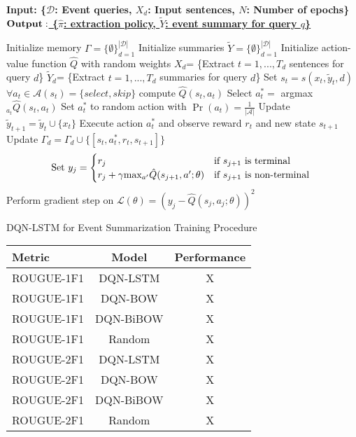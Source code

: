 \documentclass[12pt]{article}
\begin{document}
\begin{algorithm}
    \bf{Input:} { \rm  \{$\mathcal{D}$: Event queries, $X_d$: Input sentences, $N$: Number of epochs\} } \\
    \underline{$\bf{Output: }$ \rm \{$\hat{\pi}$: extraction policy, $\tilde{Y}$: event summary for query $q$\} }
\begin{algorithmic}[1]
\STATE \rm Initialize memory $\Gamma =  \{\emptyset \}^{\mathcal{|D|}}_{d=1}$
\STATE \rm Initialize summaries $\tilde{Y} = \{\emptyset \}^{\mathcal{|D|}}_{d=1} $
\STATE \rm Initialize action-value function $\hat{Q}$ with random weights
		\STATE $X_{d}$= \{Extract $t=1,...,T_d$ sentences for query $d$\}
		\STATE $\tilde{Y}_{d}$= \{Extract $t=1,...,T_d$ summaries for query $d$\}
			\STATE Set $s_t = s(x_t, \tilde{y}_t, d)$
			\STATE $ \forall a_t \in \mathcal{A}(s_t) = \{select, skip\}$ \textrm{compute} $\hat{Q}(s_t, a_t)$
			\STATE Select $a^{*}_t =$ argmax$_{a_{t}}\hat{Q}(s_t, a_t)$
				\STATE  Set $a^{*}_t $ to random action with $\Pr(a_t) =\frac{1}{| \mathcal{A} |} $
			\ENDIF
				\STATE Update $\tilde{y}_{t+1} = \tilde{y}_t \cup  \{ x_t \} $
			\ENDIF	
			\STATE Execute action $a^{*}_t$ and observe reward $r_t$ and new state $s_{t+1}$
			\STATE Update $\Gamma_d = \Gamma_d \cup \{ [s_t, a^{*}_t, r_t, s_{t+1}]\}$
		\ENDFOR
	\ENDFOR
		\STATE \[\textrm{Set } y_j= 
					\begin{cases}
						r_j              								& \text{if $s_{j+1}$ is terminal } \\
					     	r_j + \gamma $max$_{a'}\hat{Q}(s_{j+1}, a'; \theta) 	& \text{if $s_{j+1}$ is non-terminal } 
					\end{cases} 
					\]
        		\STATE Perform gradient step on $\mathcal{L}(\theta) = (y_j - \hat{Q}(s_j, a_j; \theta))^2$
		\ENDFOR
\ENDFOR
  \end{algorithmic}
    \caption{DQN-LSTM for Event Summarization Training Procedure}
\end{algorithm}


\begin{tabular}{ l | c | c  }
	\hline
	Metric  & Model  & Performance\\ \hline \hline
  	ROUGUE-1F1 & DQN-LSTM  & X \\
  	ROUGUE-1F1 & DQN-BOW  & X \\
  	ROUGUE-1F1 & DQN-BiBOW  & X \\
  	ROUGUE-1F1 & Random  & X \\ \hline
  	ROUGUE-2F1 & DQN-LSTM  & X \\
  	ROUGUE-2F1 & DQN-BOW  & X \\
  	ROUGUE-2F1 & DQN-BiBOW  & X \\
  	ROUGUE-2F1 & Random  & X \\ \hline
	\hline
\end{tabular}



\newpage


\end{document}
